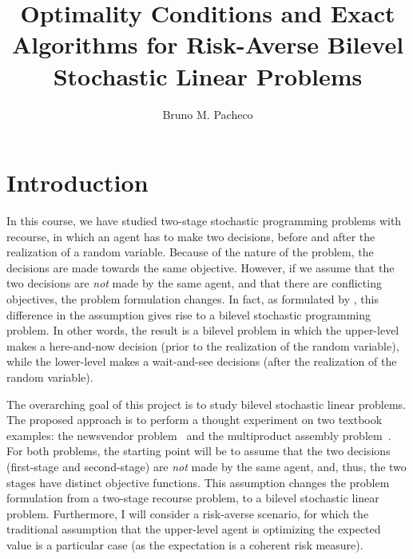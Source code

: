 \documentclass[12pt]{article}
\begin{document}
\title{Optimality Conditions and Exact Algorithms for Risk-Averse Bilevel Stochastic Linear Problems}

\author{Bruno M. Pacheco}

\maketitle

\section*{Introduction}

In this course, we have studied two-stage stochastic programming problems with recourse, in which an agent has to make two decisions, before and after the realization of a random variable.
Because of the nature of the problem, the decisions are made towards the same objective.
However, if we assume that the two decisions are \emph{not} made by the same agent, and that there are conflicting objectives, the problem formulation changes.
In fact, as formulated by \citet{burtscheidtBilevelLinearOptimization2020}, this difference in the assumption gives rise to a bilevel stochastic programming problem.
In other words, the result is a bilevel problem in which the upper-level makes a here-and-now decision (prior to the realization of the random variable), while the lower-level makes a wait-and-see decisions (after the realization of the random variable).

The overarching goal of this project is to study bilevel stochastic linear problems.
The proposed approach is to perform a thought experiment on two textbook examples: the newsvendor problem~\citep{birgeIntroductionStochasticProgramming2011,shapiroLecturesStochasticProgramming2009} and the multiproduct assembly problem~\citep{shapiroLecturesStochasticProgramming2009}.
For both problems, the starting point will be to assume that the two decisions (first-stage and second-stage) are \emph{not} made by the same agent, and, thus, the two stages have distinct objective functions.
This assumption changes the problem formulation from a two-stage recourse problem, to a bilevel stochastic linear problem. 
Furthermore, I will consider a risk-averse scenario, for which the traditional assumption that the upper-level agent is optimizing the expected value is a particular case (as the expectation is a coherent risk measure).
\end{document}
